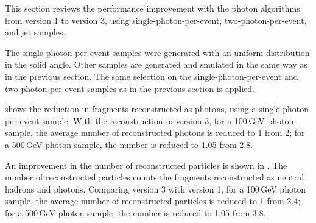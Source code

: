 This section reviews the performance improvement with the photon algorithms  from \pandora version 1 to version 3, using single-photon-per-event, two-photon-per-event, and jet samples.



The single-photon-per-event samples were generated with an uniform distribution in the solid angle. Other samples are generated and smulated in the same way as in the previous section. The same selection on the  single-photon-per-event and  two-photon-per-event samples as in the previous section is applied.

 shows the reduction in fragments reconstructed as photons, using a single-photon-per-event sample. With the reconstruction in \pandora version 3, for a 100\,GeV photon sample, the average number of reconstructed photons is reduced to 1 from 2; for a 500\,GeV photon sample, the  number is reduced to 1.05 from 2.8.



An  improvement in the number of reconstructed particles is shown in . The number of  reconstructed particles counts the fragments reconstructed as neutral hadrons and photons.  Comparing \pandora version 3 with version 1, for a 100\,GeV photon sample, the average number of reconstructed particles is reduced to 1 from 2.4; for a 500\,GeV photon sample, the number is reduced to 1.05 from 3.8.


